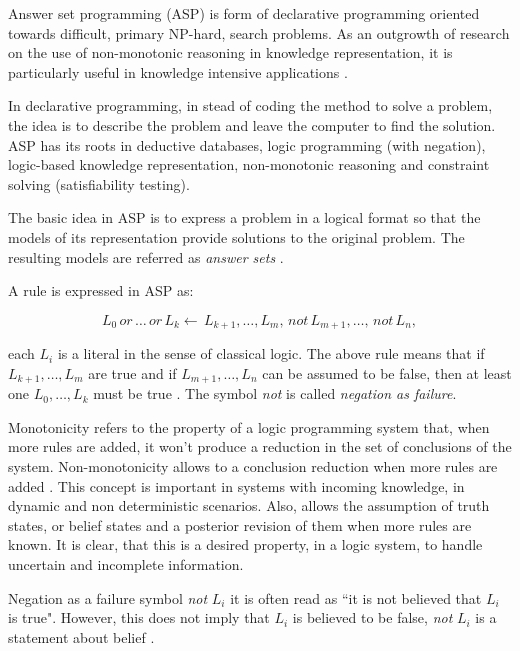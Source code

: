 Answer set programming (ASP) is form of declarative programming oriented towards difficult, primary NP-hard, search problems.
As an outgrowth of research on the use of non-monotonic reasoning in knowledge representation, it is particularly useful in knowledge intensive applications \citep{Lifschitz2008_WhatASP}. 

In declarative programming, in stead of coding the method to solve a problem, the idea is to describe the problem and leave the computer to find the solution.
ASP has its roots in deductive databases, logic programming (with negation), logic-based knowledge representation, non-monotonic reasoning and constraint solving (satisfiability testing).

The basic idea in ASP is to express a problem in a logical format so that the models of its representation provide solutions to the original problem. 
The resulting models are referred as \textit{answer sets} \citep{Gebser2013_ASP}. 


A rule is expressed in ASP as:

\begin{equation*}
L_{0} \, \textit{or} \, \dots \, \textit{or} \, L_{k} \longleftarrow \, L_{k+1} , \ldots , L_{m} , \, \textit{not} \, L_{m+1} , \ldots , \, \textit{not} \, L_{n},
\end{equation*}

each $L_{i}$ is a literal in the sense of classical logic. The above rule means that if $L_{k+1},\ldots,L_{m}$ are true and if $L_{m+1},\ldots,L_{n}$ can be assumed to be false, then at least one $L_{0},\ldots,L_{k}$ must be true \citep{Gelf88a}. The symbol \textit{not} is called \textit{negation as failure}.

Monotonicity refers to the property of a logic programming system that, when more rules are added, it won't produce a reduction in the set of conclusions of the system. 
Non-monotonicity allows to a conclusion reduction when more rules are added \citep{Poole2010_AIbook}. 
This concept is important in systems with incoming knowledge, in dynamic and non deterministic scenarios.
Also, allows the assumption of truth states, or belief states and a posterior revision of them when more rules are known.
It is clear, that this is a desired property, in a logic system, to handle uncertain and incomplete information.

Negation as a failure symbol \textit{not} $L_i$ it is often read as ``it is not believed that $L_i$ is true". 
However, this does not imply that $L_i$ is believed to be false, \textit{not} $L_i$ is a statement about belief \citep{Gelfond2014_KRRbook}.



